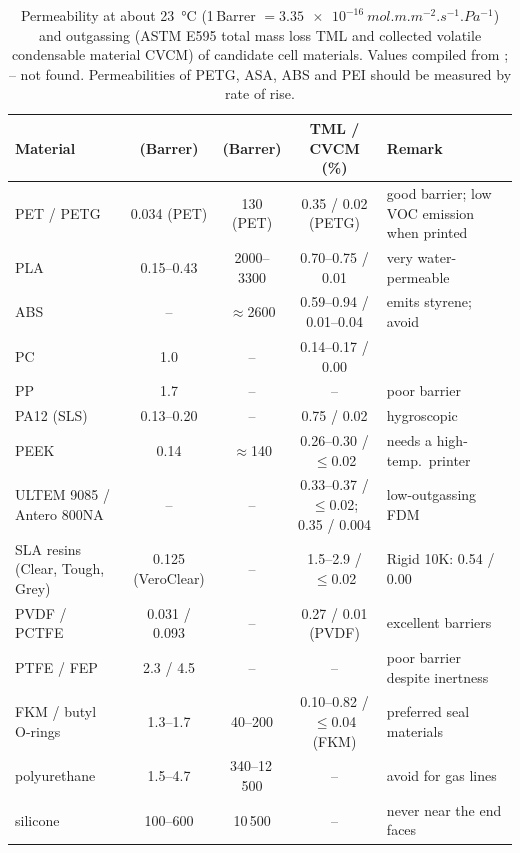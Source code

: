 \begin{table}[t]
\centering\small
\caption{Permeability at about \SI{23}{\celsius} (1\,Barrer $=\SI{3.35e-16}{mol.m.m^{-2}.s^{-1}.Pa^{-1}}$)
and outgassing (ASTM E595 total mass loss TML and collected volatile condensable material CVCM) of
candidate cell materials. Values compiled from \cite{Marano2022,Levitsky2019,Sonstevold2023,Liebrich2021,Peacock1980,Chiggiato2020,NASAoutgassing};
-- not found. Permeabilities of PETG, ASA, ABS and PEI should be measured by rate of rise.}
\label{tab:materials}
\footnotesize
\begin{tabularx}{\textwidth}{@{}l c c c Y@{}}
\toprule
Material & \Oxy{} (Barrer) & \water{} (Barrer) & TML / CVCM (\%) & Remark \\
\midrule
PET / PETG          & 0.034 (PET) & 130 (PET) & 0.35 / 0.02 (PETG) & good barrier; low VOC emission when printed \\
PLA                 & 0.15--0.43  & 2000--3300 & 0.70--0.75 / 0.01 & very water-permeable \\
ABS                 & --          & $\approx$2600 & 0.59--0.94 / 0.01--0.04 & emits styrene; avoid \\
PC                  & 1.0         & --         & 0.14--0.17 / 0.00 & \\
PP                  & 1.7         & --         & -- & poor \Oxy{} barrier \\
PA12 (SLS)          & 0.13--0.20  & --         & 0.75 / 0.02 & hygroscopic \\
PEEK                & 0.14        & $\approx$140 & 0.26--0.30 / $\leq$0.02 & needs a high-temp.\ printer \\
ULTEM 9085 / Antero 800NA & --    & --         & 0.33--0.37 / $\leq$0.02; 0.35 / 0.004 & low-outgassing FDM \\
SLA resins (Clear, Tough, Grey) & 0.125 (VeroClear) & -- & 1.5--2.9 / $\leq$0.02 & Rigid 10K: 0.54 / 0.00 \\
PVDF / PCTFE        & 0.031 / 0.093 & --       & 0.27 / 0.01 (PVDF) & excellent barriers \\
PTFE / FEP          & 2.3 / 4.5   & --         & -- & poor \Oxy{} barrier despite inertness \\
FKM / butyl O-rings & 1.3--1.7    & 40--200    & 0.10--0.82 / $\leq$0.04 (FKM) & preferred seal materials \\
polyurethane        & 1.5--4.7    & 340--12\,500 & -- & avoid for gas lines \\
silicone            & 100--600    & 10\,500    & -- & never near the end faces \\
\bottomrule
\end{tabularx}
\end{table}


